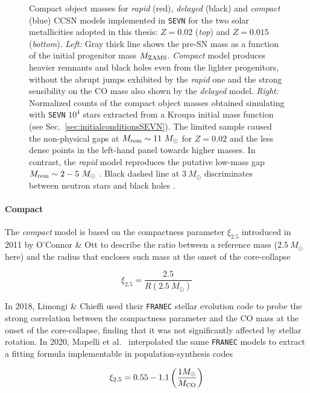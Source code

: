 \documentclass[a4paper,titlepage]{book}     	%
\newcommand{\sun}{\ensuremath{_\odot}}
\newcommand{\mzams}{M_\textup{ZAMS}}
\newcommand{\msun}{\ensuremath{M\sun}}
\begin{document}
\begin{figure}[t!]
	\caption{Compact object masses for \emph{rapid} (red), \emph{delayed} (black) and \emph{compact} (blue) CCSN models implemented in \texttt{SEVN} for the two solar metallicities adopted in this thesis: $Z=0.02$ (\emph{top}) and $Z=0.015$ (\emph{bottom}). \emph{Left:} Gray thick line shows the pre-SN mass as a function of the initial progenitor mass $\mzams$. \emph{Compact} model produces heavier remnants and black holes even from the lighter progenitors, without the abrupt jumps exhibited by the \emph{rapid} one and the strong sensibility on the CO mass also shown by the \emph{delayed} model. \emph{Right:} Normalized counts of the compact object masses obtained simulating with \texttt{SEVN} $10^4$ stars extracted from a Kroupa initial mass function (see Sec.\ \ref{sec:initialconditionsSEVN}). The limited sample caused the non-physical gaps at $M_{\rm rem} \sim 11~\msun$ for $Z=0.02$ and the less dense points in the left-hand panel towards higher masses. In contrast, the \emph{rapid} model reproduces the putative low-mass gap $M_{\rm rem} \sim 2-5~\msun$ \cite{massgapreal_ozel2010}. Black dashed line at $3~\msun$ discriminates between neutron stars and black holes \cite{NSreview}. }\label{fig:remnants}
\end{figure}


\paragraph{Compact} The \emph{compact} model is based on the compactness parameter $\xi_\mathrm{2.5}$ introduced in 2011 by O'Connor \& Ott \cite{Oconnor2011_compactness} to describe the ratio between a reference mass ($2.5~\msun$ here) and the radius that encloses such mass at the onset of the core-collapse

\begin{equation}\label{eq:compactness}
\xi_\mathrm{2.5}= \frac{2.5}{R(2.5 ~\msun)}
\end{equation}

In 2018, Limongi \& Chieffi \cite{Limongi2018_rotatingCOcompactness} used their \texttt{FRANEC} stellar evolution code to probe the strong correlation between the compactness parameter and the CO mass at the onset of the core-collapse, finding that it was not significantly affected by stellar rotation. In 2020, Mapelli et al.\ \cite{mapelli2020_compactness} interpolated the same \texttt{FRANEC} models to extract a fitting formula implementable in population-synthesis codes

\begin{equation}\label{eq:compactnessCOinSEVN}
	\xi_{2.5} = 0.55 -1.1 \left(\frac{1 \msun}{M_{\rm CO}}\right)
\end{equation}
\end{document}
